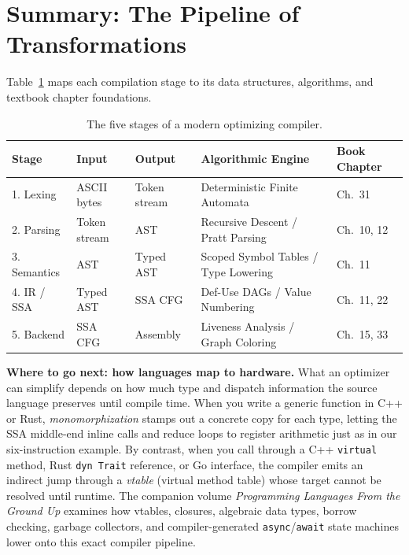 \section{Summary: The Pipeline of Transformations}
\label{ch41:summary}

Table~\ref{ch41:tab-summary} maps each compilation stage to its data structures,
algorithms, and textbook chapter foundations.

\begin{table}[H]
\centering
\small
\setlength{\tabcolsep}{4.5pt}
\begin{tabular}{lllll}
\toprule
\textbf{Stage} & \textbf{Input} & \textbf{Output} & \textbf{Algorithmic Engine} & \textbf{Book Chapter} \\
\midrule
1. Lexing & ASCII bytes & Token stream & Deterministic Finite Automata & Ch.~31 \\
2. Parsing & Token stream & AST & Recursive Descent / Pratt Parsing & Ch.~10, 12 \\
3. Semantics & AST & Typed AST & Scoped Symbol Tables / Type Lowering & Ch.~11 \\
4. IR / SSA & Typed AST & SSA CFG & Def-Use DAGs / Value Numbering & Ch.~11, 22 \\
5. Backend & SSA CFG & Assembly & Liveness Analysis / Graph Coloring & Ch.~15, 33 \\
\bottomrule
\end{tabular}
\caption{The five stages of a modern optimizing compiler.}
\label{ch41:tab-summary}
\end{table}

\begin{connectionbox}
\textbf{Where to go next: how languages map to hardware.}
What an optimizer can simplify depends on how much type and dispatch information the
source language preserves until compile time. When you write a generic function in C++
or Rust, \emph{monomorphization} stamps out a concrete copy for each type, letting the
SSA middle-end inline calls and reduce loops to register arithmetic just as in our
six-instruction example. By contrast, when you call through a C++ \texttt{virtual} method, Rust
\texttt{dyn Trait} reference, or Go interface, the compiler emits an indirect
jump through a \emph{vtable} (virtual method table) whose target cannot be resolved until
runtime. The companion volume \emph{Programming Languages From the Ground Up} examines how
vtables, closures, algebraic data types, borrow checking, garbage collectors, and
compiler-generated \texttt{async}/\texttt{await} state machines lower onto this exact
compiler pipeline.
\end{connectionbox}

